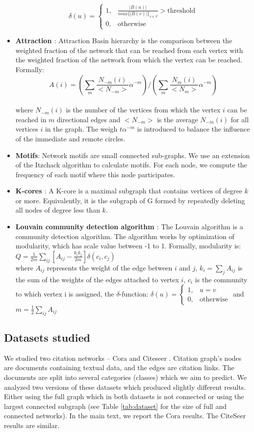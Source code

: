 \begin{itemize}
$$
\delta(u)=
\begin{cases}
1,& \frac{|B(u)|}{max\{|B(v)|\}_{v\in V}} > \text{threshold} \\
0,& \text{otherwise}
\end{cases}  
$$
\item   \textbf{Attraction \cite{muchnik2007self}}: Attraction Basin hierarchy is the comparison between the weighted fraction of the network that can be reached from each vertex with the weighted fraction of the network from which the vertex can be reached. Formally:
$$A(i)=\left(\sum_{m}\frac{N_{-m}(i)}{<N_{-m}>}\alpha^{-m}\right) \Bigg/ \left(\sum_{m}\frac{N_{m}(i)}{<N_{m}>}\alpha^{-m}\right)$$
\\ where $N_{-m}(i)$ is the number of the vertices from which the vertex $i$ can be reached in $m$ directional edges and $<N_{-m}>$ is the average $N_{-m}(i)$ for all vertices $i$ in the graph. The weigh $t\alpha^{-m}$ is introduced to balance the influence of the immediate and remote circles.
\item   \textbf{Motifs}: Network motifs are small connected sub-graphs. We use an extension of the Itzchack algorithm \cite{itzhack2007optimal} to calculate motifs. For each node, we compute the frequency of each motif where this node participates. 
\item   \textbf{K-cores \cite{batagelj2003m}}:  A K-core is a maximal subgraph that contains vertices of degree $k$ or more. Equivalently, it is the subgraph of G formed by repeatedly deleting all nodes of degree less than $k$.
\item   \textbf{Louvain community detection algorithm \cite{blondel2008fast}}: The Louvain algorithm is a community detection algorithm. The algorithm works by optimization of modularity, which has scale value between -1 to 1. Formally, modularity is:
$Q=\frac{1}{2m}\sum_{ij}\left[A_{ij}-\frac{k_{i}k_{j}}{2m}\right]\delta(c_{i},c_{j})$
\\ where $A_{ij}$ represents the weight of the edge between $i$ and $j$,  $k_{i}=\sum_{j}A_{ij}$ is the sum of the weights of the edges attached to vertex $i$,  $c_{i}$ is the community to which vertex {i} is assigned, the $\delta$-function:
$
\delta(u)=
\begin{cases}
1,& u=v\\
0,& \text{otherwise}
\end{cases}  
$ and $m=\frac{1}{2}\sum_{ij}A_{ij}$
\end{itemize}

\subsection*{Datasets studied}
We studied two citation networks – Cora and Citeseer \cite{giles1998citeseer}. Citation graph’s nodes are documents containing textual data, and the edges are citation links. The documents are split into several categories (classes) which we aim to predict. We analyzed two versions of these datasets which produced slightly different results. Either using the full graph which in both datasets is not connected or using the largest connected subgraph (see Table \ref{tab:dataset} for the size of full and connected networks). In the main text, we report the Cora results. The CiteSeer results are similar.